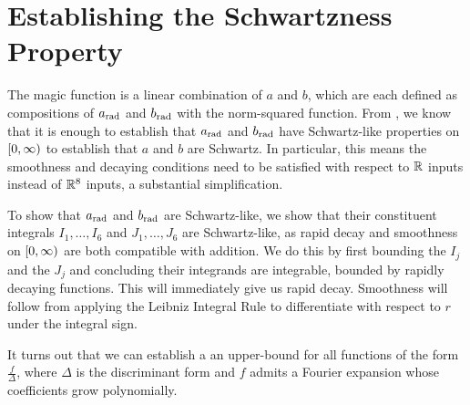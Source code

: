 \section{Establishing the Schwartzness Property}
\label{Ch4:Sec:Schwartzness}

The magic function is a linear combination of $a$ and $b$, which are each defined as compositions of $a_{\operatorname{rad}}$ and $b_{\operatorname{rad}}$ with the norm-squared function. From , we know that it is enough to establish that $a_{\operatorname{rad}}$ and $b_{\operatorname{rad}}$ have Schwartz-like properties on $\left[0, \infty\right)$ to establish that $a$ and $b$ are Schwartz. In particular, this means the smoothness and decaying conditions need to be satisfied with respect to $\mathbb{R}$ inputs instead of $\mathbb{R}^8$ inputs, a substantial simplification.

To show that $a_{\operatorname{rad}}$ and $b_{\operatorname{rad}}$ are Schwartz-like, we show that their constituent integrals $I_1, \ldots, I_6$ and $J_1, \ldots, J_6$ are Schwartz-like, as rapid decay and smoothness on $\left[0, \infty\right)$ are both compatible with addition. We do this by first bounding the $I_j$ and the $J_j$ and concluding their integrands are integrable, bounded by rapidly decaying functions. This will immediately give us rapid decay. Smoothness will follow from applying the Leibniz Integral Rule to differentiate with respect to $r$ under the integral sign.

It turns out that we can establish a an upper-bound for all functions of the form $\frac{f}{\Delta}$, where $\Delta$ is the discriminant form and $f$ admits a Fourier expansion whose coefficients grow polynomially.

